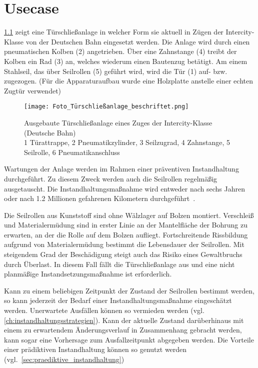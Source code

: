 \chapter{Usecase}
\label{ch:usecase}
\cref{fig:foto_tureschliessanlage} zeigt eine Türschließanlage in welcher Form sie aktuell in Zügen der Intercity-Klasse von der Deutschen Bahn eingesetzt werden. Die Anlage wird durch einen pneumatischen Kolben (2) angetrieben. Über eine Zahnstange (4) treibt der Kolben ein Rad (3) an, welches wiederum einen Bautenzug betätigt. Am einem Stahlseil, das über Seilrollen (5) geführt wird, wird die Tür (1) auf- bzw. zugezogen. (Für die Apparaturaufbau wurde eine Holzplatte anstelle einer echten Zugtür verwendet)

\begin{figure}[ht]
	\centering
	\texttt{[image: Foto\_Türschließanlage\_beschriftet.png]}
	\caption{Ausgebaute Türschließanlage eines Zuges der Intercity-Klasse (Deutsche Bahn)\\1 Türattrappe, 2 Pneumatikzylinder, 3 Seilzugrad, 4 Zahnstange, 5 Seilrolle, 6 Pneumatikanschluss}
	\label{fig:foto_tureschliessanlage}
\end{figure}

Wartungen der Anlage werden im Rahmen einer präventiven Instandhaltung durchgeführt. Zu diesem Zweck werden auch die Seilrollen regelmäßig ausgetauscht. Die Instandhaltungsmaßnahme wird entweder nach sechs Jahren oder nach \num{1.2} Millionen gefahrenen Kilometern durchgeführt~\cite{db.2021}.

Die Seilrollen aus Kunststoff sind ohne Wälzlager auf Bolzen montiert. Verschleiß und Materialermüdung sind in erster Linie an der Mantelfläche der Bohrung zu erwarten, an der die Rolle auf dem Bolzen aufliegt. Fortschreitende Rissbildung aufgrund von Materialermüdung bestimmt die Lebensdauer der Seilrollen. Mit steigendem Grad der Beschädigung steigt auch das Risiko eines Gewaltbruchs durch Überlast. In diesem Fall fällt die Türschließanlage aus und eine nicht planmäßige Instandsetzungsmaßnahme ist erforderlich.

Kann zu einem beliebigen Zeitpunkt der Zustand der Seilrollen bestimmt werden, so kann jederzeit der Bedarf einer Instandhaltungsmaßnahme eingeschätzt werden. Unerwartete Ausfällen können so vermieden werden (vgl. \cref{ch:instandhaltungsstrategien}). Kann der aktuelle Zustand darüberhinaus mit einem zu erwartendem Änderungsverlauf in Zusammenhang gebracht werden, kann sogar eine Vorhersage zum Ausfallzeitpunkt abgegeben werden. Die Vorteile einer prädiktiven Instandhaltung können so genutzt werden (vgl.~\cref{sec:praediktive_instandhaltung})

